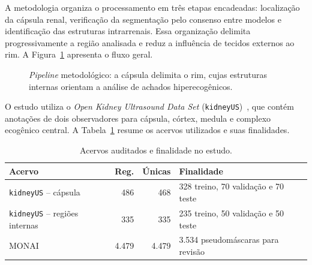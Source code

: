 \documentclass[12pt]{article}
\begin{document}
A metodologia organiza o processamento em três etapas encadeadas: localização da cápsula renal, verificação da segmentação pelo consenso entre modelos e identificação das estruturas intrarrenais. Essa organização delimita progressivamente a região analisada e reduz a influência de tecidos externos ao rim. A Figura~\ref{fig:tikz_pipeline} apresenta o fluxo geral.

\begin{figure}[htb!]
\centering
{}
\caption{\textit{Pipeline} metodológico: a cápsula delimita o rim, cujas estruturas internas orientam a análise de achados hiperecogênicos.}
\label{fig:tikz_pipeline}
\end{figure}

O estudo utiliza o \textit{Open Kidney Ultrasound Data Set} (\texttt{kidneyUS})~\cite{Singla2023KidneyUS}, que contém anotações de dois observadores para cápsula, córtex, medula e complexo ecogênico central. A Tabela~\ref{tab:data} resume os acervos utilizados e suas finalidades.

\begin{table}[htb!]
\centering
\caption{Acervos auditados e finalidade no estudo.}
\label{tab:data}
\small
\begin{tabular}{lrrp{}}
\hline
\textbf{Acervo} & \textbf{Reg.} & \textbf{Únicas} & \textbf{Finalidade} \\
\hline
\texttt{kidneyUS} -- cápsula & 486 & 468 & 328 treino, 70 validação e 70 teste \\
\texttt{kidneyUS} -- regiões internas & 335 & 335 & 235 treino, 50 validação e 50 teste \\
MONAI & 4.479 & 4.479 & 3.534 pseudomáscaras para revisão \\
\hline
\end{tabular}
\end{table}
\end{document}
